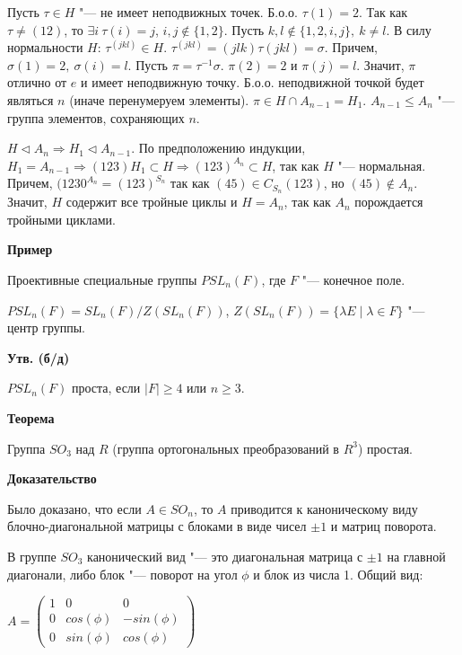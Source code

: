 \documentclass{article}
\begin{document}
Пусть $\tau \in H$ "--- не имеет неподвижных точек. Б.о.о. $\tau(1) = 2$. Так как $\tau \neq (1 2)$, то $\exists i \  \tau(i) = j$, $i, j \notin \{1, 2\}$. Пусть $k, l \notin \{1, 2, i, j\}, \  k \neq l$. В силу нормальности $H$: $\tau^{(j k l)} \in H$. $\tau^{(j k l)} = (j l k)\tau(j k l) = \sigma$. Причем, $\sigma(1) = 2, \  \sigma(i) = l$. Пусть $\pi= \tau^{-1}\sigma$. $\pi(2) = 2$ и $\pi(j) = l$. Значит, $\pi$ отлично от $e$ и имеет неподвижную точку. Б.о.о. неподвижной точкой будет являться $n$ (иначе перенумеруем элементы). $\pi \in H \cap A_{n-1} = H_1$. $A_{n-1} \leq A_n$ "--- группа элементов, сохраняющих $n$.

$H \triangleleft A_n \Rightarrow H_1 \triangleleft A_{n-1}$. По предположению индукции, $H_1 = A_{n-1} \Rightarrow (1 2 3)H_1 \subset H \Rightarrow (1 2 3)^{A_n} \subset H$, так как $H$ "--- нормальная. Причем, $(1 2 30^{A_n} = (1 2 3)^{S_n}$ так как $(4 5) \in C_{S_n}(1 2 3)$, но $(4 5) \notin A_n$. Значит, $H$ содержит все тройные циклы и $H = A_n$, так как $A_n$ порождается тройными циклами.

\vspace{10pt}

\textbf{Пример}

Проективные специальные группы $PSL_n(F)$, где $F$ "--- конечное поле.

$PSL_n(F) = SL_n(F) / Z(SL_n(F))$, $Z(SL_n(F)) = \{\lambda E \mid \lambda \in F\}$ "--- центр группы.

\vspace{5pt}

\textbf{Утв. (б/д)}

$PSL_n(F)$ проста, если $|F| \geq 4$ или $n \geq 3$.

\textbf{Теорема}

Группа $SO_3$ над $R$ (группа ортогональных преобразований в $R^3$) простая.

\textbf{Доказательство}

Было доказано, что если $A \in SO_n$, то $A$ приводится к каноническому виду блочно-диагональной матрицы с блоками в виде чисел $\pm 1$ и матриц поворота.

В группе $SO_3$ канонический вид "--- это диагональная матрица с $\pm 1$ на главной диагонали, либо блок "--- поворот на угол $\phi$ и блок из числа 1. Общий вид:

$A = \begin{pmatrix}
1 & 0 & 0 \\
0 & cos(\phi) & -sin(\phi) \\
0 & sin(\phi) & cos(\phi)
\end{pmatrix}$
\end{document}
